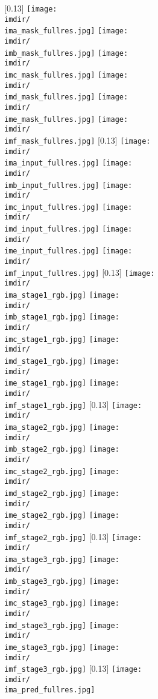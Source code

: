 \documentclass[runningheads]{llncs}
\begin{document}
\newcommand{\imdir}{figures/intermediate_result_supp/}
\newcommand{\ima}{f2598_1_2}
\newcommand{\imb}{f1570_1_1}
\newcommand{\imc}{a3163_1_1}
\newcommand{\imd}{a0041_1_5}
\newcommand{\ime}{a0782_1_4}
\newcommand{\imf}{a3427_1_4}

\begin{figure*}[hthb]
\centering


\subcaptionbox{}[0.13\linewidth]
{
\texttt{[image: \\imdir/\\ima\_mask\_fullres.jpg]}
\texttt{[image: \\imdir/\\imb\_mask\_fullres.jpg]}
\texttt{[image: \\imdir/\\imc\_mask\_fullres.jpg]}
\texttt{[image: \\imdir/\\imd\_mask\_fullres.jpg]}
\texttt{[image: \\imdir/\\ime\_mask\_fullres.jpg]}
\texttt{[image: \\imdir/\\imf\_mask\_fullres.jpg]}
}
\subcaptionbox{}[0.13\linewidth]
{
\texttt{[image: \\imdir/\\ima\_input\_fullres.jpg]}
\texttt{[image: \\imdir/\\imb\_input\_fullres.jpg]}
\texttt{[image: \\imdir/\\imc\_input\_fullres.jpg]}
\texttt{[image: \\imdir/\\imd\_input\_fullres.jpg]}
\texttt{[image: \\imdir/\\ime\_input\_fullres.jpg]}
\texttt{[image: \\imdir/\\imf\_input\_fullres.jpg]}
}
\subcaptionbox{}[0.13\linewidth]
{
\texttt{[image: \\imdir/\\ima\_stage1\_rgb.jpg]}
\texttt{[image: \\imdir/\\imb\_stage1\_rgb.jpg]}
\texttt{[image: \\imdir/\\imc\_stage1\_rgb.jpg]}
\texttt{[image: \\imdir/\\imd\_stage1\_rgb.jpg]}
\texttt{[image: \\imdir/\\ime\_stage1\_rgb.jpg]}
\texttt{[image: \\imdir/\\imf\_stage1\_rgb.jpg]}
}
\subcaptionbox{}[0.13\linewidth]
{
\texttt{[image: \\imdir/\\ima\_stage2\_rgb.jpg]}
\texttt{[image: \\imdir/\\imb\_stage2\_rgb.jpg]}
\texttt{[image: \\imdir/\\imc\_stage2\_rgb.jpg]}
\texttt{[image: \\imdir/\\imd\_stage2\_rgb.jpg]}
\texttt{[image: \\imdir/\\ime\_stage2\_rgb.jpg]}
\texttt{[image: \\imdir/\\imf\_stage2\_rgb.jpg]}
}
\subcaptionbox{}[0.13\linewidth]
{
\texttt{[image: \\imdir/\\ima\_stage3\_rgb.jpg]}
\texttt{[image: \\imdir/\\imb\_stage3\_rgb.jpg]}
\texttt{[image: \\imdir/\\imc\_stage3\_rgb.jpg]}
\texttt{[image: \\imdir/\\imd\_stage3\_rgb.jpg]}
\texttt{[image: \\imdir/\\ime\_stage3\_rgb.jpg]}
\texttt{[image: \\imdir/\\imf\_stage3\_rgb.jpg]}
}
\subcaptionbox{}[0.13\linewidth]
{
\texttt{[image: \\imdir/\\ima\_pred\_fullres.jpg]}
}
\end{figure*}
\end{document}
